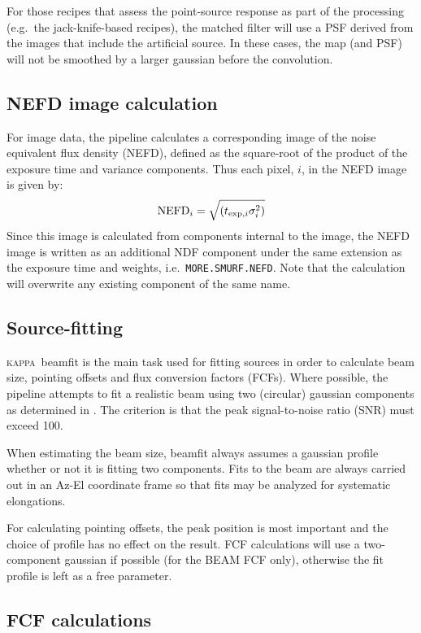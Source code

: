 \documentclass[twoside,11pt]{article}
\renewcommand{\_}{\texttt{\symbol{95}}}
\newcommand{\KAPPA}{\textsc{kappa}}
\newcommand{\task}[1]{\textsf{#1}}
\newcommand{\snrmin}{100}
\begin{document}
For those recipes that assess the point-source response as part of the
processing (e.g.\ the jack-knife-based recipes), the matched filter
will use a PSF derived from the images that include the artificial
source. In these cases, the map (and PSF) will not be smoothed by a
larger gaussian before the convolution.

\subsection{NEFD image calculation}

For image data, the pipeline calculates a corresponding image of the
noise equivalent flux density (NEFD), defined as the square-root of
the product of the exposure time and variance components. Thus each
pixel, $i$, in the NEFD image is given by:
\begin{equation}
{\rm NEFD}_i = \sqrt{(t_{{\rm exp},i} \sigma_i^2)}
\end{equation}
Since this image is calculated from components internal to the image,
the NEFD image is written as an additional NDF component under the
same extension as the exposure time and weights, i.e.\,
\verb+MORE.SMURF.NEFD+. Note that the calculation will overwrite any
existing component of the same name.

\subsection{Source-fitting}

\KAPPA\ \task{beamfit} is the main task used for fitting sources in
order to calculate beam size, pointing offsets and flux conversion
factors (FCFs). Where possible, the pipeline attempts to fit a
realistic beam using two (circular) gaussian components as determined
in \cite{scuba2calpaper}. The criterion is that the peak
signal-to-noise ratio (SNR) must exceed \snrmin.

When estimating the beam size, \task{beamfit} always assumes a
gaussian profile whether or not it is fitting two components. Fits to
the beam are always carried out in an Az-El coordinate frame so that
fits may be analyzed for systematic elongations.

For calculating pointing offsets, the peak position is most important
and the choice of profile has no effect on the result. FCF
calculations will use a two-component gaussian if possible (for the
BEAM FCF only), otherwise the fit profile is left as a free parameter.

\subsection{FCF calculations}
\end{document}
